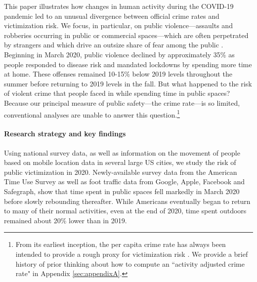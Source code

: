 \documentclass[12pt]{article}
\begin{document}
This paper illustrates how changes in human activity during the COVID-19 pandemic led to an unusual divergence between official crime rates and victimization risk. We focus, in particular, on public violence---assaults and robberies occurring in public or commercial spaces---which are often perpetrated by strangers and which drive an outsize share of fear among the public \citep{ferraro1995fear, pickett2012reconsidering, hanslmaier2013crime, ferraro2017measurement}. Beginning in March 2020, public violence declined by approximately 35\% as people responded to disease risk and mandated lockdowns by spending more time at home. These offenses remained 10-15\% below 2019 levels throughout the summer before returning to 2019 levels in the fall. But what happened to the risk of violent crime that people faced in while spending time in public spaces? Because our principal measure of public safety---the crime rate---is so limited, conventional analyses are unable to answer this question.\footnote{From its earliest inception, the per capita crime rate has always been intended to provide a rough proxy for victimization risk \citep{boggs1965urban, stipak1988alternatives, vaughan2020promise, ramos2021improving}. %
We provide a brief history of prior thinking about how to compute an ``activity adjusted crime rate" in Appendix \ref{sec:appendixA}.}


\paragraph{Research strategy and key findings}


Using national survey data, as well as information on the movement of people based on mobile location data in several large US cities, we study the risk of public victimization in 2020. Newly-available survey data from the American Time Use Survey as well as foot traffic data from Google, Apple, Facebook and Safegraph, show that time spent in public spaces fell markedly in March 2020 before slowly rebounding thereafter. While Americans eventually began to return to many of their normal activities, even at the end of 2020, time spent outdoors remained about 20\% lower than in 2019.
\end{document}
